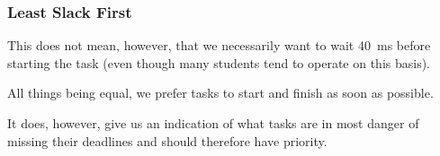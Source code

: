 \begin{frame}
\frametitle{Least Slack First}
This does not mean, however, that we necessarily want to wait 40~ms before starting the task (even though many students tend to operate on this basis). 

All things being equal, we prefer tasks to start and finish as soon as possible. 

It does, however, give us an indication of what tasks are in most danger of missing their deadlines and should therefore have priority.

\end{frame}



